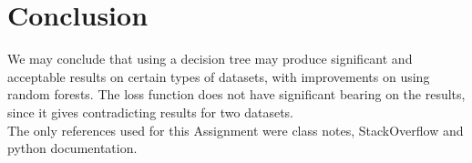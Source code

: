 \documentclass{article}
\begin{document}
\section{Conclusion}
We may conclude that using a decision tree may produce significant and acceptable results on certain types of datasets, with improvements on using random forests. The loss function does not have significant bearing on the results, since it gives contradicting results for two datasets.\\
The only references used for this Assignment were class notes, StackOverflow and python documentation.
\end{document}
